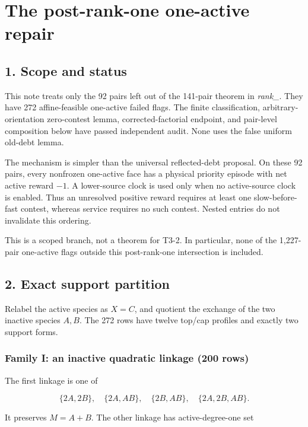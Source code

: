 \section{The post-rank-one one-active
repair}

\subsection{1. Scope and status}

This note treats only the 92 pairs left out of the 141-pair theorem in
\emph{rank\_\texttt{}}. They have 272
affine-feasible one-active failed flags. The finite classification,
arbitrary-orientation zero-contest lemma, corrected-factorial endpoint,
and pair-level composition below have passed independent audit. None
uses the false uniform old-debt lemma.

The mechanism is simpler than the universal reflected-debt proposal. On
these 92 pairs, every nonfrozen one-active face has a physical priority
episode with net active reward \(-1\). A lower-source clock is used only
when no active-source clock is enabled. Thus an unresolved positive
reward requires at least one slow-before-fast contest, whereas service
requires no such contest. Nested entries do not invalidate this
ordering.

This is a scoped branch, not a theorem for T3-2. In particular, none of
the 1,227-pair one-active flags outside this post-rank-one intersection
is included.

\subsection{2. Exact support partition}

Relabel the active species as \(X=C\), and quotient the exchange of the
two inactive species \(A,B\). The 272 rows have twelve top/cap profiles
and exactly two support forms.

\subsubsection{Family I: an inactive quadratic linkage (200
rows)}

The first linkage is one of

\[
 \{2A,2B\},\quad \{2A,AB\},\quad \{2B,AB\},\quad
 \{2A,2B,AB\}.                                      \tag{2.1}
\]

It preserves \(M=A+B\). The other linkage has active-degree-one set

